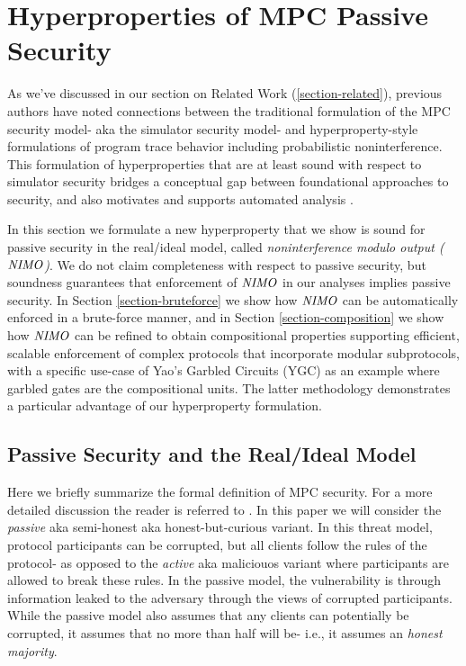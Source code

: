 \section{Hyperproperties of MPC Passive Security}

As we've discussed in our section on Related Work
(\ref{section-related}), previous authors have noted connections
between the traditional formulation of the MPC security model- aka the
simulator security model- and hyperproperty-style formulations of
program trace behavior \cite{XXX} including probabilistic
noninterference. This formulation of hyperproperties that are at least
sound with respect to simulator security bridges a conceptual gap
between foundational approaches to security, and also motivates and
supports automated analysis \cite{XXX}.

In this section we formulate a new hyperproperty that we show is sound
for passive security in the real/ideal model, called
\emph{noninterference modulo output ($\mathit{NIMO}$)}. We do not claim
completeness with respect to passive security, but soundness
guarantees that enforcement of $\mathit{NIMO}$ in our analyses implies passive
security. In Section \ref{section-bruteforce} we show how $\mathit{NIMO}$ can
be automatically enforced in a brute-force manner, and in Section
\ref{section-composition} we show how $\mathit{NIMO}$ can be refined to obtain
compositional properties supporting efficient, scalable enforcement of
complex protocols that incorporate modular subprotocols, with a
specific use-case of Yao's Garbled Circuits (YGC) as an example where
garbled gates are the compositional units.  The latter methodology
demonstrates a particular advantage of our hyperproperty formulation.

\subsection{Passive Security and the Real/Ideal Model} Here we
briefly summarize the formal definition of MPC security. For a
more detailed discussion the reader is referred to \cite{XXX}.
In this paper we will consider the \emph{passive} aka
semi-honest aka honest-but-curious variant. In this threat
model, protocol participants can be corrupted, but all clients
follow the rules of the protocol- as opposed to the
\emph{active} aka maliciouos variant where participants
are allowed to break these rules. In the passive model, the
vulnerability is through information leaked to the adversary
through the views of corrupted participants. While the passive
model also assumes that any clients can potentially be
corrupted, it assumes that no more than half will be-
i.e., it assumes an \emph{honest majority}. 

